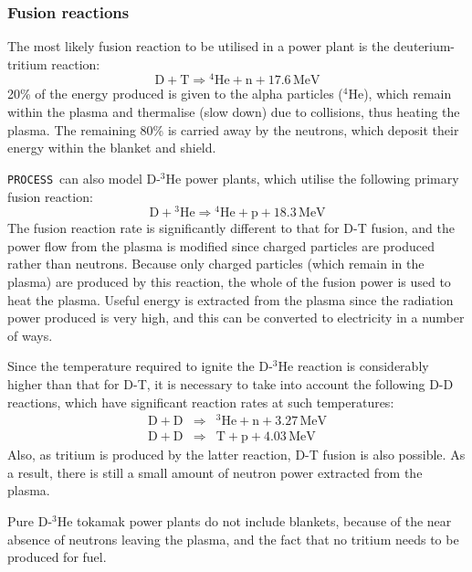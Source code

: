 \documentclass[11pt,a4paper]{report}
\newcommand{\process}{\mbox{\texttt{PROCESS}}}
\begin{document}
\subsubsection{Fusion reactions}

The most likely fusion reaction to be utilised in a power plant is the
deuterium-tritium reaction:
\begin{equation}
\mathrm{D + T} \Longrightarrow \mathrm{^{4}He + n + 17.6 \,MeV}
\label{eq:d-t}
\end{equation}
20\% of the energy produced is given to the alpha particles ($^4$He), which
remain within the plasma and thermalise (slow down) due to collisions, thus
heating the plasma. The remaining 80\% is carried away by the neutrons, which
deposit their energy within the blanket and shield.

\process\ can also model D-$^3$He power plants, which utilise the following primary
fusion reaction:
\begin{equation}
\mathrm{D + \mbox{$^3$He}} \Longrightarrow \mathrm{^{4}He + p + 18.3 \,MeV}
\label{eq:dhe3}
\end{equation}
The fusion reaction rate is significantly different to that for D-T fusion,
and the power flow from the plasma is modified since charged particles are
produced rather than neutrons. Because only charged particles (which remain in
the plasma) are produced by this reaction, the whole of the fusion power is
used to heat the plasma. Useful energy is extracted from the plasma since the
radiation power produced is very high, and this can be converted to
electricity in a number of ways.

Since the temperature required to ignite the D-$^3$He reaction is considerably
higher than that for D-T, it is necessary to take into account the following
D-D reactions, which have significant reaction rates at such temperatures:
\begin{eqnarray}
\mathrm{D + D} & \Longrightarrow & \mathrm{^{3}He + n + 3.27 \,MeV} \\
\mathrm{D + D} & \Longrightarrow & \mathrm{T + p + 4.03 \,MeV}
\end{eqnarray}
Also, as tritium is produced by the latter reaction, D-T fusion is also
possible. As a result, there is still a small amount of neutron power
extracted from the plasma.

Pure D-$^3$He tokamak power plants do not include blankets, because of the near
absence of neutrons leaving the plasma, and the fact that no tritium needs to
be produced for fuel.
\end{document}
